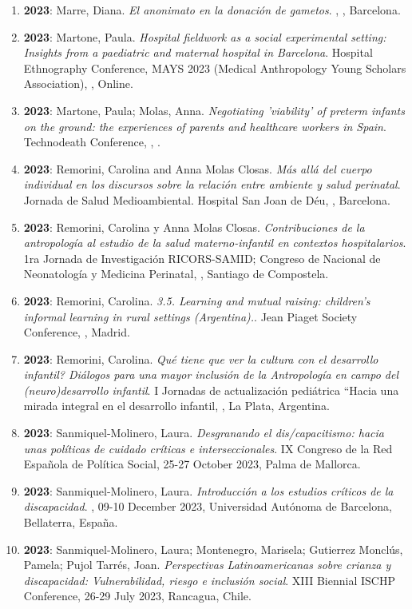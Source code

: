 \begin{enumerate}
\item {\bf 2023}: Marre, Diana. {\it El anonimato en la donación de gametos}. , , Barcelona.\filbreak
\item {\bf 2023}: Martone, Paula. {\it Hospital fieldwork as a social experimental setting:  
Insights from a paediatric and maternal hospital in Barcelona}. Hospital Ethnography Conference, MAYS 2023 (Medical Anthropology Young Scholars Association), , Online.\filbreak
\item {\bf 2023}: Martone, Paula; Molas, Anna. {\it Negotiating 'viability' of preterm infants on the ground: the experiences of parents and healthcare workers in Spain}. Technodeath Conference, , .\filbreak
\item {\bf 2023}: Remorini, Carolina and Anna Molas Closas. {\it Más allá del cuerpo individual en los discursos sobre la relación entre ambiente y salud perinatal}. Jornada de Salud Medioambiental. Hospital San Joan de Déu, , Barcelona.\filbreak
\item {\bf 2023}: Remorini, Carolina y Anna Molas Closas. {\it Contribuciones de la antropología al estudio de la salud materno-infantil en contextos hospitalarios}. 1ra Jornada de Investigación RICORS-SAMID; Congreso de Nacional de Neonatología y Medicina Perinatal, , Santiago de Compostela.\filbreak
\item {\bf 2023}: Remorini, Carolina. {\it 3.5.	Learning and mutual raising: children's informal learning in rural settings (Argentina).}. Jean Piaget Society Conference, , Madrid.\filbreak
\item {\bf 2023}: Remorini, Carolina. {\it Qué tiene que ver la cultura con el desarrollo infantil? Diálogos para una mayor inclusión de la Antropología en campo del (neuro)desarrollo infantil}. I Jornadas de actualización pediátrica “Hacia una mirada integral en el desarrollo infantil, , La Plata, Argentina.\filbreak
\item {\bf 2023}: Sanmiquel-Molinero, Laura. {\it Desgranando el dis/capacitismo: hacia unas políticas de cuidado críticas e interseccionales}. IX Congreso de la Red Española de Política Social, 25-27 October 2023, Palma de Mallorca.\filbreak
\item {\bf 2023}: Sanmiquel-Molinero, Laura. {\it Introducción a los estudios críticos de la discapacidad}. , 09-10 December 2023, Universidad Autónoma de Barcelona, Bellaterra, España.\filbreak
\item {\bf 2023}: Sanmiquel-Molinero, Laura; Montenegro, Marisela; Gutierrez Monclús, Pamela; Pujol Tarrés, Joan. {\it Perspectivas Latinoamericanas sobre crianza y discapacidad: Vulnerabilidad, riesgo e inclusión social}. XIII Biennial ISCHP Conference, 26-29 July 2023, Rancagua, Chile.\filbreak

\end{enumerate}
